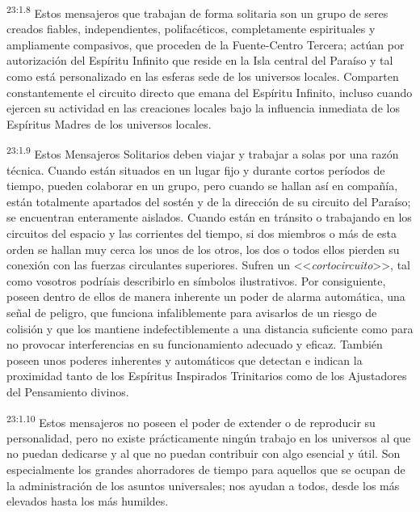 \par
\textsuperscript{23:1.8} Estos mensajeros que trabajan de forma solitaria son un grupo de seres creados fiables, independientes, polifacéticos, completamente espirituales y ampliamente compasivos, que proceden de la Fuente-Centro Tercera; actúan por autorización del Espíritu Infinito que reside en la Isla central del Paraíso y tal como está personalizado en las esferas sede de los universos locales. Comparten constantemente el circuito directo que emana del Espíritu Infinito, incluso cuando ejercen su actividad en las creaciones locales bajo la influencia inmediata de los Espíritus Madres de los universos locales.

\par
\textsuperscript{23:1.9} Estos Mensajeros Solitarios deben viajar y trabajar a solas por una razón técnica. Cuando están situados en un lugar fijo y durante cortos períodos de tiempo, pueden colaborar en un grupo, pero cuando se hallan así en compañía, están totalmente apartados del sostén y de la dirección de su circuito del Paraíso; se encuentran enteramente aislados. Cuando están en tránsito o trabajando en los circuitos del espacio y las corrientes del tiempo, si dos miembros o más de esta orden se hallan muy cerca los unos de los otros, los dos o todos ellos pierden su conexión con las fuerzas circulantes superiores. Sufren un <<\textit{cortocircuito}>>, tal como vosotros podríais describirlo en símbolos ilustrativos. Por consiguiente, poseen dentro de ellos de manera inherente un poder de alarma automática, una señal de peligro, que funciona infaliblemente para avisarlos de un riesgo de colisión y que los mantiene indefectiblemente a una distancia suficiente como para no provocar interferencias en su funcionamiento adecuado y eficaz. También poseen unos poderes inherentes y automáticos que detectan e indican la proximidad tanto de los Espíritus Inspirados Trinitarios como de los Ajustadores del Pensamiento divinos.

\par
\textsuperscript{23:1.10} Estos mensajeros no poseen el poder de extender o de reproducir su personalidad, pero no existe prácticamente ningún trabajo en los universos al que no puedan dedicarse y al que no puedan contribuir con algo esencial y útil. Son especialmente los grandes ahorradores de tiempo para aquellos que se ocupan de la administración de los asuntos universales; nos ayudan a todos, desde los más elevados hasta los más humildes.

